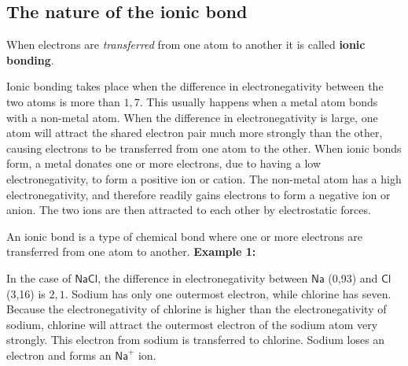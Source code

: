             \subsection*{The nature of the ionic bond}
            \nopagebreak
        \label{m38684*id142190}When electrons are \textsl{transferred} from one atom to another it is called \textbf{ionic bonding}.\par 
        \label{m38684*id142218}Ionic bonding takes place when the difference in electronegativity between the two atoms is more than $1,7$. This usually happens when a metal atom bonds with a non-metal atom. When the difference in electronegativity is large, one atom will attract the shared electron pair much more strongly than the other, causing electrons to be transferred from one atom to the other. When ionic bonds form, a metal donates one or more electrons, due to having a low electronegativity, to form a positive ion or cation. The non-metal atom has a high electronegativity, and therefore readily gains electrons to form a negative ion or anion. The two ions are then attracted to each other by electrostatic forces. \par 
\label{m38684*fhsst!!!underscore!!!id456}
 { \label{m38684*meaningfhsst!!!underscore!!!id456}
        An ionic bond is a type of chemical bond where one or more electrons are transferred from one atom to another.
         } 
        \label{m38684*id142248}
          \textbf{Example 1:}
        \par 
        \label{m38684*id142255}In the case of $\mathsf{NaCl}$, the difference in electronegativity between $\textsf{Na}$ (0,93) and $\textsf{Cl}$ (3,16) is $2,1$. Sodium has only one outermost electron, while chlorine has seven. Because the electronegativity of chlorine is higher than the electronegativity of sodium, chlorine will attract the outermost electron of the sodium atom very strongly. This electron from sodium is transferred to chlorine. Sodium loses an electron and forms an ${\mathsf{Na}}^{+}$ ion. \\
  \par
